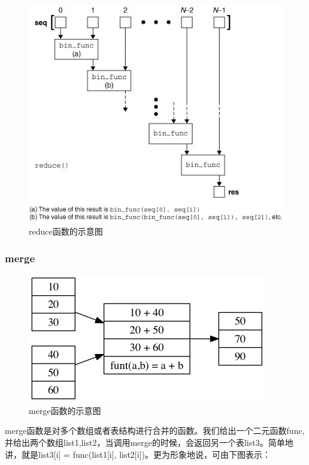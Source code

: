 \documentclass[paper=a4]{ctexart} %
\numberwithin{equation}{section} %
\numberwithin{figure}{section} %
\numberwithin{table}{section} %
\begin{document}
\begin{figure}[htbp]
\centering
\includegraphics[width=\textwidth]{pic/reduce.png}
\caption{reduce函数的示意图}
\end{figure}

\subsubsection{merge}

\begin{figure}[htbp]
\centering
\includegraphics[width=\textwidth]{pic/merge.png}
\caption{merge函数的示意图}
\end{figure}

merge函数是对多个数组或者表结构进行合并的函数。我们给出一个二元函数func,并给出两个数组list1,list2，当调用merge的时候，会返回另一个表list3。简单地讲，就是list3[i] = func(list1[i], list2[i])。更为形象地说，可由下图表示：
\end{document}
